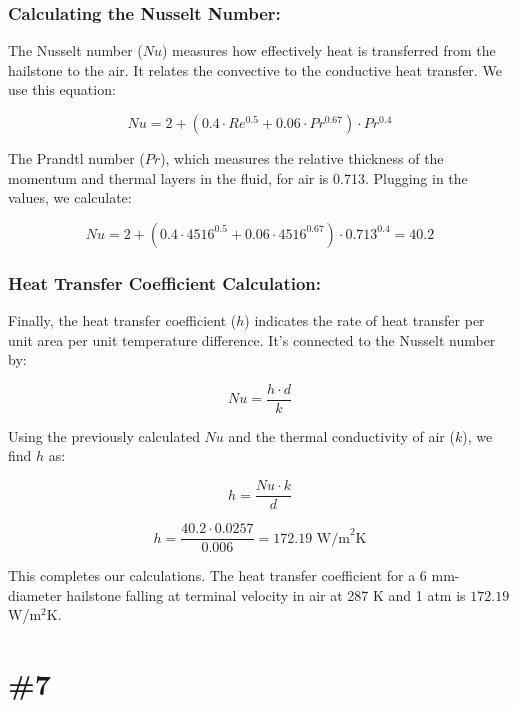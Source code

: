 \documentclass{article}
\numberwithin{equation}{section}
\begin{document}
\subsubsection*{Calculating the Nusselt Number:}
The Nusselt number (\(Nu\)) measures how effectively heat is transferred from the hailstone to the air. It relates the convective to the conductive heat transfer. We use this equation:

\begin{equation}
Nu = 2 + (0.4 \cdot Re^{0.5} + 0.06 \cdot Pr^{0.67}) \cdot Pr^{0.4}
\end{equation}

The Prandtl number (\(Pr\)), which measures the relative thickness of the momentum and thermal layers in the fluid, for air is 0.713. Plugging in the values, we calculate:

\begin{equation}
Nu = 2 + (0.4 \cdot 4516^{0.5} + 0.06 \cdot 4516^{0.67}) \cdot 0.713^{0.4} = 40.2
\end{equation}

\subsubsection*{Heat Transfer Coefficient Calculation:}
Finally, the heat transfer coefficient (\(h\)) indicates the rate of heat transfer per unit area per unit temperature difference. It's connected to the Nusselt number by:

\begin{equation}
Nu = \frac{h \cdot d}{k}
\end{equation}

Using the previously calculated \(Nu\) and the thermal conductivity of air (\(k\)), we find \(h\) as:

\begin{equation}
h = \frac{Nu \cdot k}{d}
\end{equation}

\begin{equation}
h = \frac{40.2 \cdot 0.0257}{0.006} = 172.19 \text{ W/m}^2\text{K}
\end{equation}

This completes our calculations. The heat transfer coefficient for a 6 mm-diameter hailstone falling at terminal velocity in air at 287 K and 1 atm is \( 172.19 \) W/m\(^2\)K.

\newpage
\section{\#7}
\end{document}
